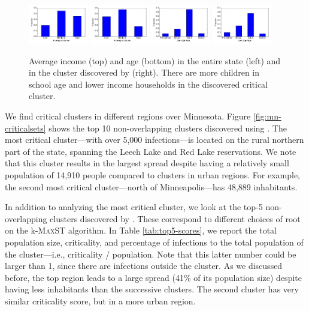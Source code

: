 \begin{figure}
\centering
\includegraphics[width=0.23\textwidth]{img/mn-income.pdf}
\includegraphics[width=0.23\textwidth]{img/kmaxst-11-income.pdf}
\includegraphics[width=0.23\textwidth]{img/mn-age.pdf}
\includegraphics[width=0.23\textwidth]{img/kmaxst-11-age.pdf}
\vspace{-.15in}
\caption{Average income (top) and age (bottom) in the entire state (left) and in the cluster discovered by \algomaxcrit{} (right). There are more children in school age and lower income households in the discovered critical cluster.}
\label{fig:cluster-demographics}
\end{figure}

We find critical clusters in different regions over Minnesota. Figure \ref{fig:mn-criticalsets} shows the top 10 non-overlapping clusters discovered using \algomaxcrit{}. The most critical cluster---with over 5,000 infections---is located on the rural northern part of the state, spanning the Leech Lake and Red Lake reservations. We note that this cluster results in the largest spread despite having a relatively small population of 14,910 people compared to clusters in urban regions. For example, the second most critical cluster---north of Minneapolis---has 48,889 inhabitants. %

In addition to analyzing the most critical cluster, we look at the top-5 non-overlapping clusters discovered by \algomaxcrit{}. These correspond to different choices of root on the k-\textsc{MaxST} algorithm. In Table \ref{tab:top5-scores}, we report the total population size, criticality, and percentage of infections to the total population of the cluster---i.e., criticality / population. Note that this latter number could be larger than 1, since there are infections outside the cluster. As we discussed before, the top region leads to a large spread (41\% of its population size) despite having less inhabitants than the successive clusters. The second cluster has very similar criticality score, but in a more urban region.

